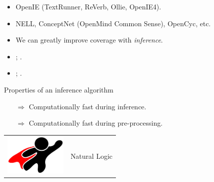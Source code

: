 \documentclass[hyperref]{beamer}
\begin{document}
\begin{frame}[noframenumbering]{}
\begin{itemize}
  \item OpenIE (TextRunner, ReVerb, Ollie, OpenIE4).
  \item NELL, ConceptNet (OpenMind Common Sense), OpenCyc, etc.
\end{itemize}
\vspace{0.5cm}
\pause

\begin{itemize}
  \item We can greatly improve coverage with \textit{inference}.
\end{itemize}
\vspace{0.5cm}
\pause

\begin{itemize}
  \item {}; .
\end{itemize}
\pause

\begin{itemize}
  \item {}; .
\end{itemize}
\end{frame}

\begin{frame}{Properties of an inference algorithm}
\begin{itemize}
  \item[$\Rightarrow$] Computationally fast during inference.
\end{itemize}
\pause
\vspace{0.5cm}

\begin{itemize}
  \item[$\Rightarrow$] Computationally fast during pre-processing.
\end{itemize}
\pause
\vspace{0.5cm}

\pause
\vspace{0.5cm}

\begin{center}
  \begin{tabular}{rl}
    \multicolumn{1}{m{3cm}}{\includegraphics[width=3cm]{../../img/superhero.pdf}} &
    \huge{Natural Logic}
  \end{tabular}
\end{center}
\end{frame}
\end{document}
